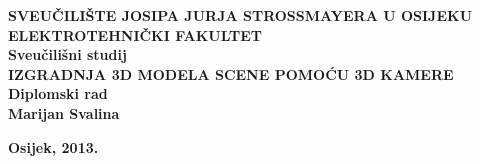 \newpage
\begin{titlepage}
\begin{center}

\textbf{\MakeUppercase{\large 
    Sveučilište Josipa Jurja Strossmayera u Osijeku}}\\[0.2cm]

\textbf{\MakeUppercase{\large Elektrotehnički fakultet}}\\[0.8cm]
\textbf{\large Sveučilišni studij}\\ [5cm]

\textbf{\MakeUppercase{\Large 
    Izgradnja 3D modela scene pomoću 3D kamere }}\\ [1cm]

\textbf{\large Diplomski rad}\\  [5 cm] 

\textbf{\Large Marijan Svalina}\\ [0.5cm] 

\vfill

\textbf{\large Osijek, 2013.} \\

\end{center}
\end{titlepage}
